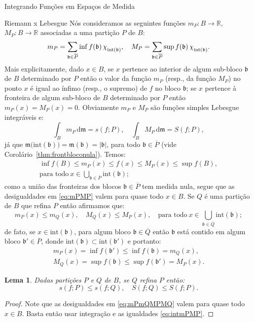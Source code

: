 \documentclass[oneside,final,11pt]{amsbook}
\newcommand{\R}{\mathds R}
\newcommand{\leb}{\mathfrak m}
\newcommand{\Int}{\mathrm{int}}
\newcommand{\dd}{\mathrm d}
\newcommand{\chilow}[1]{\chi_{\lower2pt\hbox{$\scriptstyle#1$}}}
\theoremstyle{remark}\newtheorem{exercise}{Exercício}[chapter]
\theoremstyle{remark}\newtheorem{*exercise}[exercise]{\hbox to 0pt{\hskip 0pt minus 1fil*}Exercício}
\theoremstyle{definition}\newtheorem{exdefin}{Definição}[chapter]
\theoremstyle{plain}\newtheorem{teo}{Teorema}[section]
\theoremstyle{plain}\newtheorem{lem}[teo]{Lema}
\theoremstyle{plain}\newtheorem{prop}[teo]{Proposição}
\theoremstyle{plain}\newtheorem{cor}[teo]{Corolário}
\theoremstyle{definition}\newtheorem{defin}[teo]{Definição}
\theoremstyle{remark}\newtheorem{rem}[teo]{Observação}
\theoremstyle{definition}\newtheorem{notation}[teo]{Notação}
\theoremstyle{definition}\newtheorem{convention}[teo]{Convenção}
\theoremstyle{definition}\newtheorem{example}[teo]{Exemplo}
\numberwithin{section}{chapter}
\numberwithin{equation}{section}
\begin{document}
\begin{chapter}{Integrando Funções em Espaços de Medida}
\begin{section}{Riemann x Lebesgue}
Nós consideramos as seguintes funções $m_P:B\to\R$, $M_P:B\to\R$ associadas a uma partição
$P$ de $B$:
\[m_P=\sum_{\mathfrak b\in\overline P}\inf f(\mathfrak b)\,\chilow{\Int(\mathfrak b)},\quad
M_P=\sum_{\mathfrak b\in\overline P}\sup f(\mathfrak b)\,\chilow{\Int(\mathfrak b)}.\]
Mais explicitamente, dado $x\in B$, se $x$ pertence ao interior de algum sub-bloco
$\mathfrak b$ de $B$ determinado por $P$ então o valor da função $m_P$ (resp., da função $M_P$)
no ponto $x$ é igual ao ínfimo (resp., o supremo) de $f$ no bloco $\mathfrak b$;
se $x$ pertence à fronteira de algum sub-bloco de $B$ determinado por $P$ então $m_P(x)=M_P(x)=0$.
Obviamente $m_P$ e $M_P$ são funções simples Lebesgue integráveis e:
\begin{equation}\label{eq:intmPMP}
\int_Bm_P\,\dd\leb=s(f;P),\quad\int_BM_P\,\dd\leb=S(f;P),
\end{equation}
já que $\leb\big(\Int(\mathfrak b)\big)=\leb(\mathfrak b)=\vert\mathfrak b\vert$,
para todo $\mathfrak b\in\overline P$ (vide Corolário~\ref{thm:frontbloconula}). Temos:
\begin{multline}\label{eq:mPMP}
\inf f(B)\le m_P(x)\le f(x)\le M_P(x)\le\sup f(B),\\
\text{para todo}\ x\in\bigcup_{\mathfrak b\in\overline P}\Int(\mathfrak b);
\end{multline}
como a união das fronteiras dos blocos $\mathfrak b\in\overline P$ tem medida nula,
segue que as desigualdades em \eqref{eq:mPMP} valem para quase todo $x\in B$. Se
$Q$ é uma partição de $B$ que refina $P$ então afirmamos que:
\begin{equation}\label{eq:mPmQMPMQ}
m_P(x)\le m_Q(x),\quad M_Q(x)\le M_P(x),\quad
\text{para todo}\ x\in\bigcup_{\mathfrak b\in\overline Q}\Int(\mathfrak b);
\end{equation}
de fato, se $x\in\Int(\mathfrak b)$, para algum bloco $\mathfrak b\in\overline Q$ então
$\mathfrak b$ está contido em algum bloco $\mathfrak b'\in\overline P$, donde
$\Int(\mathfrak b)\subset\Int(\mathfrak b')$ e portanto:
\begin{gather*}
m_P(x)=\inf f(\mathfrak b')\le\inf f(\mathfrak b)=m_Q(x),\\
M_Q(x)=\sup f(\mathfrak b)\le\sup f(\mathfrak b')=M_P(x).
\end{gather*}

\begin{lem}\label{thm:sSrefina}
Dadas partições $P$ e $Q$ de $B$, se $Q$ refina $P$ então:
\[s(f;P)\le s(f;Q),\quad S(f;Q)\le S(f;P).\]
\end{lem}
\begin{proof}
Note que as desigualdades em \eqref{eq:mPmQMPMQ} valem para quase todo $x\in B$. Basta
então usar integração e as igualdades \eqref{eq:intmPMP}.
\end{proof}


\end{section}
\end{chapter}
\end{document}
